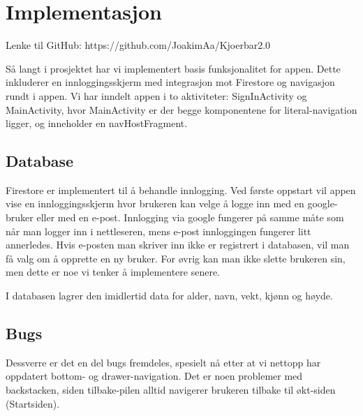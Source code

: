 \section{Implementasjon}
Lenke til GitHub: https://github.com/JoakimAa/Kjoerbar2.0

Så langt i prosjektet har vi implementert basis funksjonalitet for appen. Dette inkluderer en innloggingsskjerm med integrasjon mot Firestore og navigasjon rundt i appen. Vi har inndelt appen i to aktiviteter: SignInActivity og MainActivity, hvor MainActivity er der begge komponentene for literal-navigation ligger, og inneholder en navHostFragment. 

\subsection{Database}
Firestore er implementert til å behandle innlogging. Ved første oppstart vil appen vise en innloggingsskjerm hvor brukeren kan velge å logge inn med en google-bruker eller med en e-post. Innlogging via google fungerer på samme måte som når man logger inn i nettleseren, mens e-post innloggingen fungerer litt annerledes. Hvis e-posten man skriver inn ikke er registrert i databasen, vil man få valg om å opprette en ny bruker. For øvrig kan man ikke slette brukeren sin, men dette er noe vi tenker å implementere senere.

I databasen lagrer den imidlertid data for alder, navn, vekt, kjønn og høyde.

\subsection{Bugs}
Dessverre er det en del bugs fremdeles, spesielt nå etter at vi nettopp har oppdatert bottom- og drawer-navigation. Det er noen problemer med backstacken, siden tilbake-pilen alltid navigerer brukeren tilbake til økt-siden (Startsiden).
